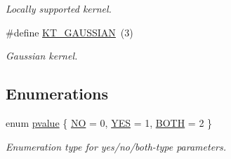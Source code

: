 \begin{CompactItemize}
\begin{CompactList}\small\item\em Locally supported kernel. \item\end{CompactList}\item 
\hypertarget{group__applications__fastsumS2__test_g3a03d7fde39f1ba22a4549e72c8cbf39}{
\#define \hyperlink{group__applications__fastsumS2__test_g3a03d7fde39f1ba22a4549e72c8cbf39}{KT\_\-GAUSSIAN}~(3)}
\label{group__applications__fastsumS2__test_g3a03d7fde39f1ba22a4549e72c8cbf39}

\begin{CompactList}\small\item\em Gaussian kernel. \item\end{CompactList}\end{CompactItemize}
\subsection*{Enumerations}
\begin{CompactItemize}
\item 
enum \hyperlink{group__applications__fastsumS2__test_gd09943f93b91eb526d8081a4963eead8}{pvalue} \{ \hyperlink{group__applications__fastsumS2__test_ggd09943f93b91eb526d8081a4963eead80d077f5b932ce05e5b9f30c6087a2f31}{NO} =  0, 
\hyperlink{group__applications__fastsumS2__test_ggd09943f93b91eb526d8081a4963eead899f136a862ba5c7d16967231c29f09d6}{YES} =  1, 
\hyperlink{group__applications__fastsumS2__test_ggd09943f93b91eb526d8081a4963eead8627abe5a430420baf29ebe1940a7f2fb}{BOTH} =  2
 \}
\begin{CompactList}\small\item\em Enumeration type for yes/no/both-type parameters. \item\end{CompactList}\end{CompactItemize}
